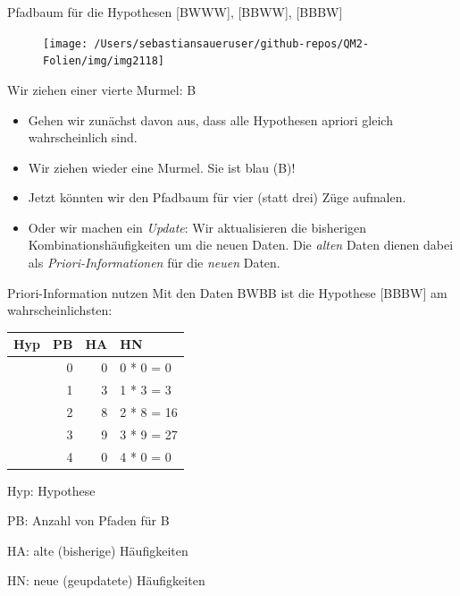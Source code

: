 \documentclass[
  ngerman,
  ignorenonframetext,
]{beamer}
\providecommand{\tightlist}{%
  \setlength{\itemsep}{0pt}\setlength{\parskip}{0pt}}
\begin{document}
\begin{frame}{Pfadbaum für die Hypothesen {[}BWWW{]}, {[}BBWW{]},
{[}BBBW{]}}
\protect\hypertarget{pfadbaum-fuxfcr-die-hypothesen-bwww-bbww-bbbw}{}
\begin{figure}[H]
\texttt{[image: /Users/sebastiansaueruser/github-repos/QM2-Folien/img/img2118]} \end{figure}
\end{frame}

\begin{frame}{Wir ziehen einer vierte Murmel: B}
\protect\hypertarget{wir-ziehen-einer-vierte-murmel-b}{}
\begin{itemize}
\tightlist
\item
  Gehen wir zunächst davon aus, dass alle Hypothesen apriori gleich
  wahrscheinlich sind.
\item
  Wir ziehen wieder eine Murmel. Sie ist blau (B)!
\item
  Jetzt könnten wir den Pfadbaum für vier (statt drei) Züge aufmalen.
\item
  Oder wir machen ein \emph{Update}: Wir aktualisieren die bisherigen
  Kombinationshäufigkeiten um die neuen Daten. Die \emph{alten} Daten
  dienen dabei als \emph{Priori-Informationen} für die \emph{neuen}
  Daten.
\end{itemize}
\end{frame}

\begin{frame}{Priori-Information nutzen}
\protect\hypertarget{priori-information-nutzen}{}
Mit den Daten BWBB ist die Hypothese {[}BBBW{]} am wahrscheinlichsten:

\begin{tabular}[t]{l|r|r|l}
\hline
Hyp & PB & HA & HN\\
\hline
[W W W W] & 0 & 0 & 0 * 0 = 0\\
\hline
[B W W W] & 1 & 3 & 1 * 3 = 3\\
\hline
[B B W W] & 2 & 8 & 2 * 8 = 16\\
\hline
[B B B W] & 3 & 9 & 3 * 9 = 27\\
\hline
[B B B B] & 4 & 0 & 4 * 0 = 0\\
\hline
\end{tabular}

Hyp: Hypothese

PB: Anzahl von Pfaden für B

HA: alte (bisherige) Häufigkeiten

HN: neue (geupdatete) Häufigkeiten
\end{frame}
\end{document}
